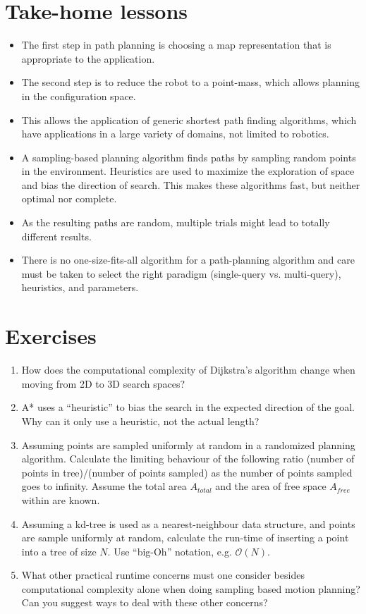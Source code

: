 \section*{Take-home lessons}
\begin{itemize}
\item The first step in path planning is choosing a map representation that is appropriate to the application.
\item The second step is to reduce the robot to a point-mass, which allows planning in the configuration space.
\item This allows the application of generic shortest path finding algorithms, which have applications in a large variety of domains, not limited to robotics.
\item A sampling-based planning algorithm finds paths by sampling random points in the environment. Heuristics are used to maximize the exploration of space and bias the direction of search. This makes these algorithms fast, but neither optimal nor complete.
\item As the resulting paths are random, multiple trials might lead to totally different results.
\item There is no one-size-fits-all algorithm for a path-planning algorithm and care must be taken to select the right paradigm (single-query vs. multi-query), heuristics, and parameters.
\end{itemize}

\section*{Exercises}\small
\begin{enumerate}
\item How does the computational complexity of Dijkstra's algorithm change when moving from 2D to 3D search spaces?
\item A* uses a ``heuristic'' to bias the search in the expected direction of the goal. Why can it only use a heuristic, not the actual length?
\item Assuming points are sampled uniformly at random in a randomized planning algorithm. Calculate the limiting behaviour of the following ratio   (number of points in tree)/(number of points sampled) as the number of points sampled goes to infinity. Assume the total area $A_{total}$ and the area of free space $A_{free}$ within are known.

\item Assuming a kd-tree is used as a nearest-neighbour data structure, and points are sample uniformly at random, calculate the  run-time of inserting a point into a tree of size $N$. Use ``big-Oh'' notation, e.g. $\mathcal{O}(N)$.

\item What other practical runtime concerns must one consider besides computational complexity alone when doing sampling based motion planning? Can you suggest ways to deal with these other concerns?
\end{enumerate}

\normalsize
